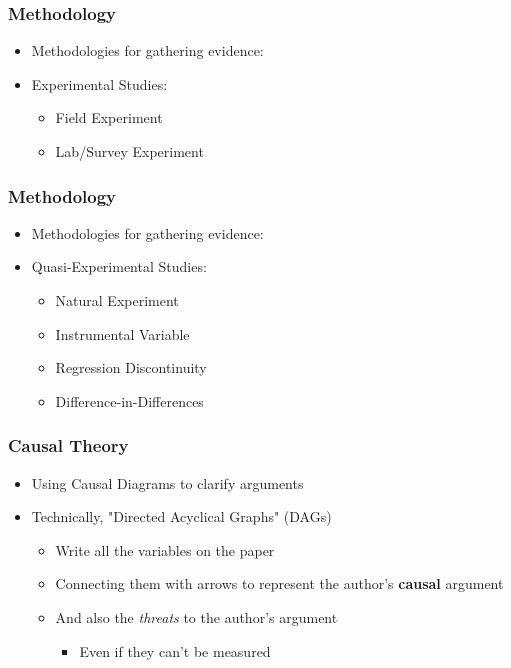 \documentclass[xcolor=x11names,compress]{beamer}\usepackage[]{graphicx}\usepackage[]{color}
\renewcommand{\(}{\begin{columns}}
\renewcommand{\)}{\end{columns}}
\newcommand{\<}[1]{\begin{column}{#1}}
\renewcommand{\>}{\end{column}}
\begin{document}
\begin{frame}
\frametitle{Methodology}
\begin{itemize}
\item Methodologies for gathering evidence:
\pause
\item Experimental Studies:
\pause
\begin{itemize}
\item Field Experiment
\pause
\item Lab/Survey Experiment
\end{itemize}
\end{itemize}
\end{frame}

\begin{frame}
\frametitle{Methodology}
\begin{itemize}
\item Methodologies for gathering evidence:
\pause
\item Quasi-Experimental Studies:
\pause
\begin{itemize}
\item Natural Experiment
\pause
\item Instrumental Variable
\pause
\item Regression Discontinuity
\pause
\item Difference-in-Differences
\end{itemize}
\end{itemize}
\end{frame}



\begin{frame}
\frametitle{Causal Theory}
\begin{itemize}
\item Using Causal Diagrams to clarify arguments
\pause
\item Technically, "Directed Acyclical Graphs" (DAGs)
\pause
\begin{itemize}
\item Write all the variables on the paper
\pause
\item Connecting them with arrows to represent the author's \textbf{causal} argument
\pause
\item And also the \textit{threats} to the author's argument
\begin{itemize}
\item Even if they can't be measured
\end{itemize}
\end{itemize}
\end{itemize}
\end{frame}
\end{document}
